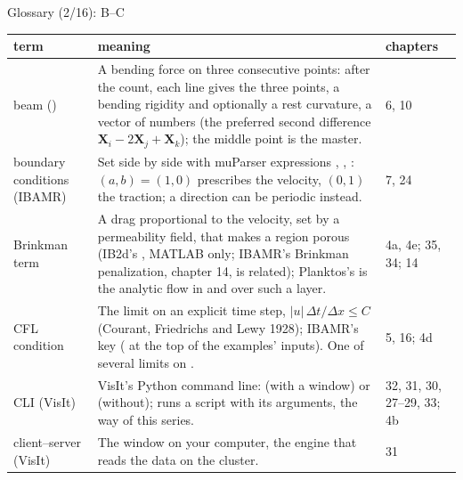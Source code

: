 \documentclass[aspectratio=169,11pt]{beamer}
\makeatletter
\newenvironment{glossarytable}{\scriptsize\renewcommand{\arraystretch}{1.08}%
  \begin{tabular}{@{}L{0.19\textwidth}L{0.63\textwidth}L{0.12\textwidth}@{}}\toprule
  term & meaning & chapters\\\midrule}{\bottomrule\end{tabular}}
\makeatother
\begin{document}
\begin{frame}{Glossary (2/16): B--C}
\label{fr:g2}
\begin{glossarytable}
beam () & A bending force on three consecutive points: after the count, each line gives the three points, a bending rigidity and optionally a rest curvature, a vector of  numbers (the preferred second difference $\mathbf{X}_i - 2\mathbf{X}_j + \mathbf{X}_k$); the middle point is the master. & 6, 10\\
boundary conditions (IBAMR) & Set side by side with muParser expressions , , : $(a, b) = (1, 0)$ prescribes the velocity, $(0, 1)$ the traction; a direction can be periodic instead. & 7, 24\\
Brinkman term & A drag proportional to the velocity, set by a permeability field, that makes a region porous (IB2d's , MATLAB only; IBAMR's Brinkman penalization, chapter 14, is related); Planktos's  is the analytic flow in and over such a layer. & 4a, 4e; 35, 34; 14\\
CFL condition & The limit on an explicit time step, $|u|\,\Delta t/\Delta x \le C$ (Courant, Friedrichs and Lewy 1928); IBAMR's  key ( at the top of the examples' inputs). One of several limits on . & 5, 16; 4d\\
CLI (VisIt) & VisIt's Python command line:  (with a window) or  (without);  runs a script with its arguments, the way of this series. & 32, 31, 30, 27--29, 33; 4b\\
client--server (VisIt) & The window on your computer, the engine that reads the data on the cluster. & 31\\
\end{glossarytable}
\end{frame}
\end{document}
